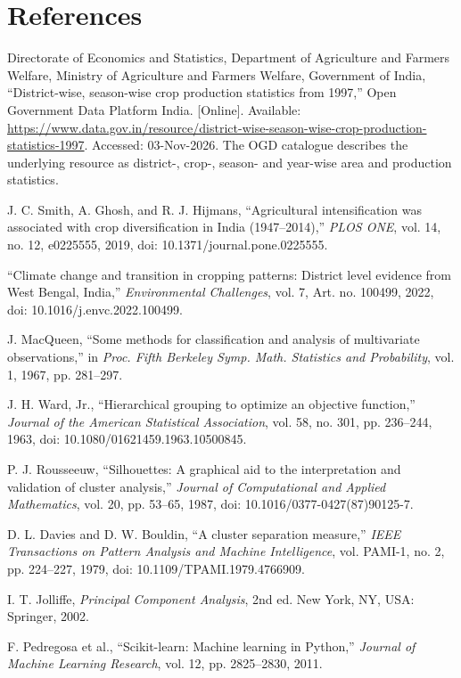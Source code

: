 \documentclass[9pt,a4paper,twocolumn]{extarticle}
\newcommand{\smallurl}[1]{\url{#1}}
\begin{document}
\section*{References}
\begin{enumerate}[label={[\arabic*]},leftmargin=2.2em,itemsep=4pt]
\item Directorate of Economics and Statistics, Department of Agriculture and Farmers Welfare, Ministry of Agriculture and Farmers Welfare, Government of India, ``District-wise, season-wise crop production statistics from 1997,'' Open Government Data Platform India. [Online]. Available: \smallurl{https://www.data.gov.in/resource/district-wise-season-wise-crop-production-statistics-1997}. Accessed: 03-Nov-2026. The OGD catalogue describes the underlying resource as district-, crop-, season- and year-wise area and production statistics.
\item J. C. Smith, A. Ghosh, and R. J. Hijmans, ``Agricultural intensification was associated with crop diversification in India (1947--2014),'' \textit{PLOS ONE}, vol. 14, no. 12, e0225555, 2019, doi: 10.1371/journal.pone.0225555.
\item ``Climate change and transition in cropping patterns: District level evidence from West Bengal, India,'' \textit{Environmental Challenges}, vol. 7, Art. no. 100499, 2022, doi: 10.1016/j.envc.2022.100499.
\item J. MacQueen, ``Some methods for classification and analysis of multivariate observations,'' in \textit{Proc. Fifth Berkeley Symp. Math. Statistics and Probability}, vol. 1, 1967, pp. 281--297.
\item J. H. Ward, Jr., ``Hierarchical grouping to optimize an objective function,'' \textit{Journal of the American Statistical Association}, vol. 58, no. 301, pp. 236--244, 1963, doi: 10.1080/01621459.1963.10500845.
\item P. J. Rousseeuw, ``Silhouettes: A graphical aid to the interpretation and validation of cluster analysis,'' \textit{Journal of Computational and Applied Mathematics}, vol. 20, pp. 53--65, 1987, doi: 10.1016/0377-0427(87)90125-7.
\item D. L. Davies and D. W. Bouldin, ``A cluster separation measure,'' \textit{IEEE Transactions on Pattern Analysis and Machine Intelligence}, vol. PAMI-1, no. 2, pp. 224--227, 1979, doi: 10.1109/TPAMI.1979.4766909.
\item I. T. Jolliffe, \textit{Principal Component Analysis}, 2nd ed. New York, NY, USA: Springer, 2002.
\item F. Pedregosa et al., ``Scikit-learn: Machine learning in Python,'' \textit{Journal of Machine Learning Research}, vol. 12, pp. 2825--2830, 2011.
\end{enumerate}
\end{document}
